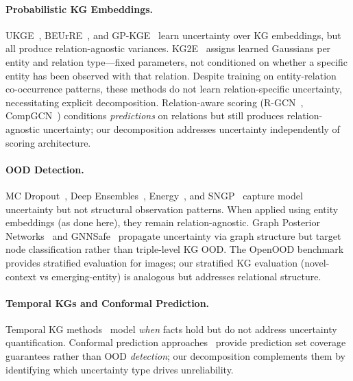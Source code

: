 
\paragraph{Probabilistic KG Embeddings.}
UKGE~\citep{chen2019embedding}, BEUrRE~\citep{chen2021probabilistic}, and GP-KGE~\citep{choudhary2021perm} learn uncertainty over KG embeddings, but all produce relation-agnostic variances.
KG2E~\citep{he2015learning} assigns learned Gaussians per entity and relation type---fixed parameters, not conditioned on whether a specific entity has been observed with that relation.
Despite training on entity-relation co-occurrence patterns, these methods do not learn relation-specific uncertainty, necessitating explicit decomposition.
Relation-aware scoring (R-GCN~\citep{schlichtkrull2018modeling}, CompGCN~\citep{vashishth2020composition}) conditions \emph{predictions} on relations but still produces relation-agnostic uncertainty; our decomposition addresses uncertainty independently of scoring architecture.

\paragraph{OOD Detection.}
MC Dropout~\citep{gal2016dropout}, Deep Ensembles~\citep{lakshminarayanan2017simple}, Energy~\citep{liu2020energy}, and SNGP~\citep{liu2020simple} capture model uncertainty but not structural observation patterns.
When applied using entity embeddings (as done here), they remain relation-agnostic.
Graph Posterior Networks~\citep{stadler2021graph} and GNNSafe~\citep{wu2023energy} propagate uncertainty via graph structure but target node classification rather than triple-level KG OOD.
The OpenOOD benchmark~\citep{zhang2023openood} provides stratified evaluation for images; our stratified KG evaluation (novel-context vs emerging-entity) is analogous but addresses relational structure.

\paragraph{Temporal KGs and Conformal Prediction.}
Temporal KG methods~\citep{garcia2018learning,lacroix2020tensor} model \emph{when} facts hold but do not address uncertainty quantification.
Conformal prediction approaches~\citep{zhu2025conformalized,zhu2025certainty} provide prediction set coverage guarantees rather than OOD \emph{detection}; our decomposition complements them by identifying which uncertainty type drives unreliability.

